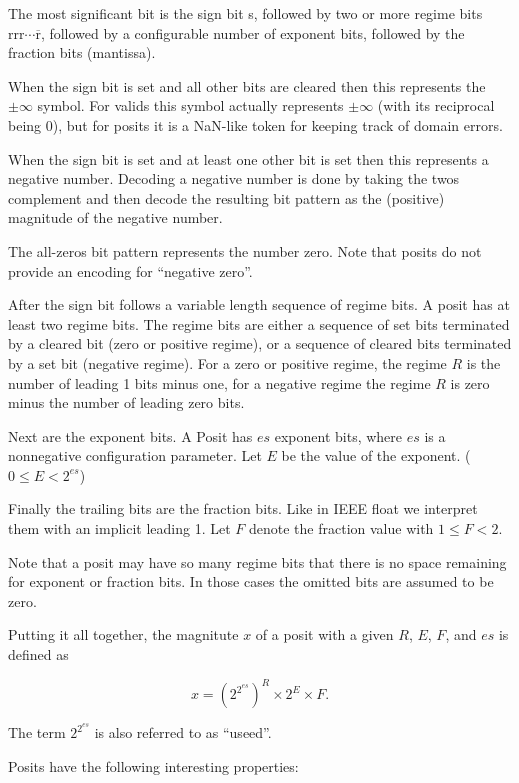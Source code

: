 The most significant bit is the sign bit s, followed by two or more regime bits
$\textrm{r}\textrm{r}\textrm{r}\cdots\overline{\textrm{r}}$, followed by a
configurable number of exponent bits, followed by the fraction bits (mantissa).

When the sign bit is set and all other bits are cleared then this represents the
$\pm\infty$ symbol. For valids this symbol actually represents $\pm\infty$ (with
its reciprocal being 0), but for posits it is a NaN-like token for keeping track
of domain errors.~\cite{GustafsonEmails}

When the sign bit is set and at least one other bit is set then this represents
a negative number. Decoding a negative number is done by taking the twos
complement and then decode the resulting bit pattern as the (positive) magnitude
of the negative number.

The all-zeros bit pattern represents the number zero. Note that posits do not
provide an encoding for ``negative zero''.

After the sign bit follows a variable length sequence of regime bits. A posit has
at least two regime bits. The regime bits are either a sequence of set bits
terminated by a cleared bit (zero or positive regime), or a sequence of cleared
bits terminated by a set bit (negative regime). For a zero or positive regime,
the regime $R$ is the number of leading 1 bits minus one, for a negative regime
the regime $R$ is zero minus the number of leading zero bits.

Next are the exponent bits. A Posit has $es$ exponent bits, where $es$ is a
nonnegative configuration parameter. Let $E$ be the value of the exponent.
($0 \le E < 2^{es}$)

Finally the trailing bits are the fraction bits. Like in IEEE float we
interpret them with an implicit leading 1. Let $F$ denote the fraction
value with $1 \le F < 2$.

Note that a posit may have so many regime bits that there is no space remaining
for exponent or fraction bits. In those cases the omitted bits are assumed to
be zero.

Putting it all together, the magnitute $x$ of a posit with a given $R$, $E$,
$F$, and $es$ is defined as

$$x = \left( 2^{2^{es}} \right)^R \times 2^E \times F\textrm{.}$$

The term $2^{2^{es}}$ is also referred to as ``useed''.

Posits have the following interesting properties:

